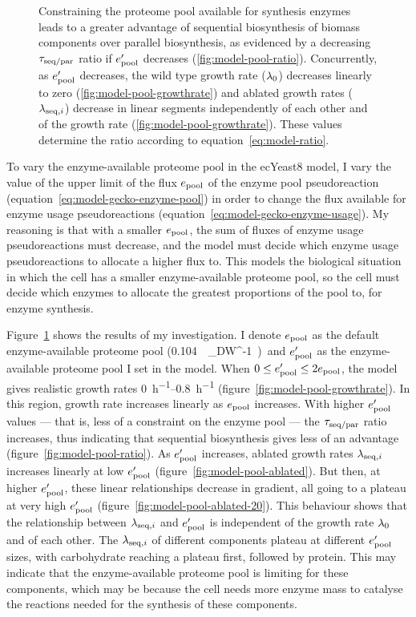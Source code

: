 \begin{figure}
  \caption{
    Constraining the proteome pool available for synthesis enzymes leads to a greater advantage of sequential biosynthesis of biomass components over parallel biosynthesis, as evidenced by a decreasing $\tau_{\mathrm{seq}/\mathrm{par}}$ ratio if $e_{\mathrm{pool}}^{\prime}$ decreases (\ref{fig:model-pool-ratio}).
    Concurrently, as $e_{\mathrm{pool}}^{\prime}$ decreases, the wild type growth rate ($\lambda_{0}$) decreases linearly to zero (\ref{fig:model-pool-growthrate}) and ablated growth rates ($\lambda_{\mathrm{seq},i}$) decrease in linear segments independently of each other and of the growth rate (\ref{fig:model-pool-growthrate}).
    These values determine the ratio according to equation~\ref{eq:model-ratio}.
  }
  \label{fig:model-pool}
\end{figure}

To vary the enzyme-available proteome pool in the ecYeast8 model,
I vary the value of the upper limit of the flux $e_{\mathrm{pool}}$ of the enzyme pool pseudoreaction (equation~\ref{eq:model-gecko-enzyme-pool}) in order to change the flux available for enzyme usage pseudoreactions (equation~\ref{eq:model-gecko-enzyme-usage}).
My reasoning is that with a smaller $e_{\mathrm{pool}}$, the sum of fluxes of enzyme usage pseudoreactions must decrease, and the model must decide which enzyme usage pseudoreactions to allocate a higher flux to.
This models the biological situation in which the cell has a smaller enzyme-available proteome pool, so the cell must decide which enzymes to allocate the greatest proportions of the pool to, for enzyme synthesis.

Figure~\ref{fig:model-pool} shows the results of my investigation.
I denote $e_{\mathrm{pool}}$ as the default enzyme-available proteome pool (\SI{0.104}{\gram~\gram_{DW}^{-1}}) and $e_{\mathrm{pool}}^{\prime}$ as the enzyme-available proteome pool I set in the model.
When $0 \leq e_{\mathrm{pool}}^{\prime} \leq 2e_{\mathrm{pool}}$, the model gives realistic growth rates \SIrange{0}{0.8}{\hour^{-1}} (figure~\ref{fig:model-pool-growthrate}).
In this region, growth rate increases linearly as $e_{\mathrm{pool}}$ increases.
With higher $e_{\mathrm{pool}}^{\prime}$ values --- that is, less of a constraint on the enzyme pool --- the $\tau_{\mathrm{seq}/\mathrm{par}}$ ratio increases, thus indicating that sequential biosynthesis gives less of an advantage (figure~\ref{fig:model-pool-ratio}).
As $e_{\mathrm{pool}}^{\prime}$ increases, ablated growth rates $\lambda_{\mathrm{seq},i}$ increases linearly at low $e_{\mathrm{pool}}^{\prime}$ (figure~\ref{fig:model-pool-ablated}).
But then, at higher $e_{\mathrm{pool}}^{\prime}$, these linear relationships decrease in gradient, all going to a plateau at very high $e_{\mathrm{pool}}^{\prime}$ (figure~\ref{fig:model-pool-ablated-20}).
This behaviour shows that the relationship between $\lambda_{\mathrm{seq},i}$ and $e_{\mathrm{pool}}^{\prime}$ is independent of the growth rate $\lambda_{0}$ and of each other.
The $\lambda_{\mathrm{seq},i}$ of different components plateau at different $e_{\mathrm{pool}}^{\prime}$ sizes, with carbohydrate reaching a plateau first, followed by protein.
This may indicate that the enzyme-available proteome pool is limiting for these components, which may be because the cell needs more enzyme mass to catalyse the reactions needed for the synthesis of these components.

